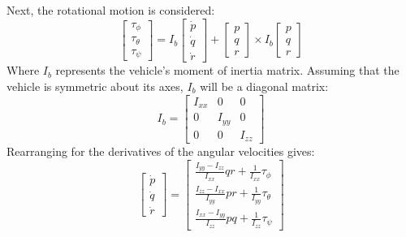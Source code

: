 Next, the rotational motion is considered:
\[
\begin{bmatrix}
\tau_{\phi}\\\tau_{\theta}\\\tau_{\psi}
\end{bmatrix}
=I_{b}
\begin{bmatrix}
\dot{p}\\\dot{q}\\\dot{r}
\end{bmatrix}
+ \begin{bmatrix}
p\\q\\r
\end{bmatrix}
\times
I_{b}
\begin{bmatrix}
p\\q\\r
\end{bmatrix}
\]
Where $I_{b}$ represents the vehicle's moment of inertia matrix. Assuming that the vehicle is symmetric about its axes, $I_{b}$ will be a diagonal matrix:
\[I_{b}=
\begin{bmatrix}
I_{xx} & 0 & 0\\
0 & I_{yy} & 0\\
0 & 0 & I_{zz}
\end{bmatrix}
\]
Rearranging for the derivatives of the angular velocities gives:
\begin{equation}\label{eqn:state3}
\begin{bmatrix}
\dot{p}\\\dot{q}\\\dot{r}
\end{bmatrix}
=
\begin{bmatrix}
\frac{I_{yy}-I_{zz}}{I_{xx}}qr+\frac{1}{I_{xx}}\tau_{\phi}\\
\frac{I_{zz}-I_{xx}}{I_{yy}}pr+\frac{1}{I_{yy}}\tau_{\theta}\\
\frac{I_{xx}-I_{yy}}{I_{zz}}pq+\frac{1}{I_{zz}}\tau_{\psi}
\end{bmatrix}
\end{equation}



